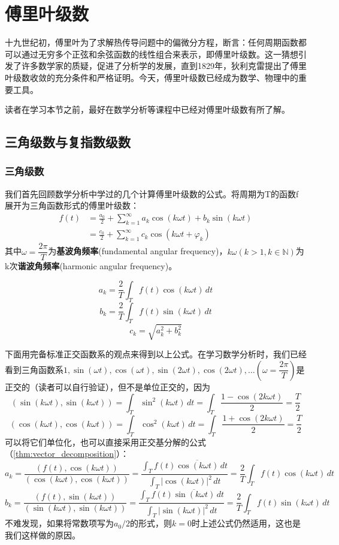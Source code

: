 \section{傅里叶级数}\label{sec:Fourier_Series}

十九世纪初，傅里叶为了求解热传导问题中的偏微分方程，断言：任何周期函数都可以通过无穷多个正弦和余弦函数的线性组合来表示，即傅里叶级数。这一猜想引发了许多数学家的质疑，促进了分析学的发展，直到1829年，狄利克雷提出了傅里叶级数收敛的充分条件和严格证明。今天，傅里叶级数已经成为数学、物理中的重要工具。

读者在学习本节之前，最好在数学分析等课程中已经对傅里叶级数有所了解。

\subsection{三角级数与复指数级数}\label{sub:tri_exp_series}

\subsubsection{三角级数}

我们首先回顾数学分析中学过的几个计算傅里叶级数的公式。将周期为T的函数f展开为三角函数形式的傅里叶级数：
\begin{align*}
    f(t) & =\frac{a_0}{2}+\sum_{k = 1}^{\infty} a_k \cos(k\omega t)+b_k\sin(k\omega t) \\
         & =\frac{c_0}{2}+\sum_{k = 1}^{\infty} c_k\cos(k\omega t+\varphi _k)
\end{align*}
其中$\omega =\dfrac{2\pi }{T}$为\textbf{基波角频率}(fundamental angular frequency)，$k\omega (k>1,k\in \mathbb{N} )$为k次\textbf{谐波角频率}(harmonic angular frequency)。
\begin{theorem}[三角函数形式的傅里叶系数公式]
\[a_k=\frac{2}{T}\int_T f(t)\cos(k\omega t)\,dt\]
\[b_k=\frac{2}{T}\int_T f(t)\sin(k\omega t)\,dt\]
\[c_k=\sqrt{a_k^2+b_k^2}\]
\end{theorem}
下面用完备标准正交函数系的观点来得到以上公式。在学习数学分析时，我们已经看到三角函数系$1,\sin(\omega t),\cos(\omega t),\sin(2\omega t),\cos(2\omega t),\dots\left(\omega =\dfrac{2\pi}{T}\right)$是正交的（读者可以自行验证），但不是单位正交的，因为
\[(\sin(k\omega t),\sin(k\omega t))=\int_{T}\sin^2(k\omega t)\,dt=\int_{T}\frac{1-\cos(2k\omega t)}{2}=\frac{T}{2}\]
\[(\cos(k\omega t),\cos(k\omega t))=\int_{T}\cos^2(k\omega t)\,dt=\int_{T}\frac{1+\cos(2k\omega t)}{2}=\frac{T}{2}\]
可以将它们单位化，也可以直接采用正交基分解的公式（\cref{thm:vector_decomposition}）：
\[a_k=\frac{(f(t),\cos(k\omega t))}{(\cos(k\omega t),\cos(k\omega t))}=\frac{\int_{T}f(t)\overline{\cos(k\omega t)}\,dt}{\int_{T}|\cos(k\omega t)|^2\,dt}
    =\frac{2}{T}\int_{T}f(t)\cos(k\omega t)\,dt\]
\[b_k=\frac{(f(t),\sin(k\omega t))}{(\sin(k\omega t),\sin(k\omega t))}=\frac{\int_{T}f(t)\overline{\sin(k\omega t)}\,dt}{\int_{T}|\sin(k\omega t)|^2\,dt}
    =\frac{2}{T}\int_{T}f(t)\sin(k\omega t)\,dt\]
不难发现，如果将常数项写为$a_0/2$的形式，则$k=0$时上述公式仍然适用，这也是我们这样做的原因。

